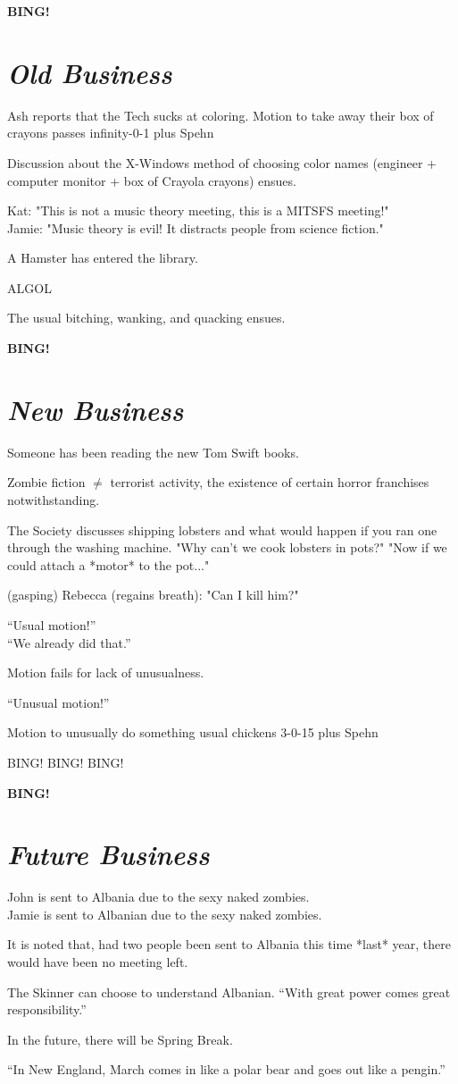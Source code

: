 \documentclass[10pt]{article}
\newcommand{\bing}{{\bf BING!} }
\newcommand{\goto}[1]{\bing \vskip 12pt \section*{{\em{#1}}}}
\newcommand{\ps}{ plus Spehn\xspace}
\begin{document}
\goto{Old Business}

Ash reports that the Tech sucks at coloring.  Motion to take away their box of 
crayons passes infinity-0-1\ps

Discussion about the X-Windows method of choosing color names (engineer +
computer monitor + box of Crayola crayons) ensues.

Kat: "This is not a music theory meeting, this is a MITSFS meeting!"\\
Jamie: "Music theory is evil!  It distracts people from science fiction."

A Hamster has entered the library.

ALGOL

The usual bitching, wanking, and quacking ensues.

\goto{New Business}

Someone has been reading the new Tom Swift books.

Zombie fiction $\neq$ terrorist activity, the existence of certain horror 
franchises notwithstanding.

The Society discusses shipping lobsters and what would happen if you ran
one through the washing machine.  "Why can't we cook lobsters in pots?" "Now
if we could attach a *motor* to the pot..."

(gasping)
Rebecca (regains breath): "Can I kill him?"

``Usual motion!''\\  ``We already did that.''

Motion fails for lack of unusualness.

``Unusual motion!''

Motion to unusually do something usual chickens 3-0-15\ps

BING!  BING!  BING!

\goto{Future Business}

John is sent to Albania due to the sexy naked zombies.\\
Jamie is sent to Albanian due to the sexy naked zombies.

It is noted that, had two people been sent to Albania this time *last* year,
there would have been no meeting left.  

The Skinner can choose to understand Albanian.  ``With great power comes
great responsibility.''

In the future, there will be Spring Break.  

``In New England, March comes in like a polar bear and goes out like a pengin.''
\end{document}
